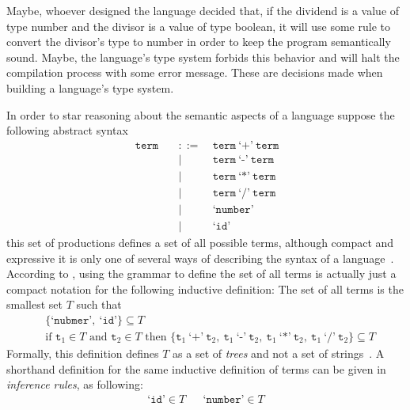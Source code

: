 \documentclass[
  oneside,
  english,
  coorientadorbanca,
  embeddedlogo,
  noabntexcite
]{ufsc-thesis-rn46-2019}
\newcommand{\bnfvar}[1]{\ \bnfvars{#1}}
\newcommand{\bnfvars}[1]{\texttt{#1}}
\newcommand{\bnfter}[1]{\ \bnfters{#1}}
\newcommand{\bnfters}[1]{\textrm{`}\texttt{#1}\textrm{'}}
\newcommand{\bnfprod}[2]{\bnfvars{#1} &\ &::= & #2}
\newcommand{\bnfmore}[1]{ && \mid{} & #1}
\begin{document}
Maybe, whoever designed the language decided that, if the dividend is a value of type number and the divisor is a value of type boolean, it will use some rule to convert the divisor's type to number in order to keep the program semantically sound.
Maybe, the language's type system forbids this behavior and will halt the compilation process with some error message.
These are decisions made when building a language's type system.

In order to star reasoning about the semantic aspects of a language suppose the following abstract syntax
\begin{equation}~\label{eq:sample_term_ast}
  \begin{alignedat}{2}
    \bnfprod{term}{\bnfvar{term} \bnfter{+} \bnfvar{term}} \\
    \bnfmore{\bnfvar{term} \bnfter{-} \bnfvar{term}}       \\
    \bnfmore{\bnfvar{term} \bnfter{*} \bnfvar{term}}       \\
    \bnfmore{\bnfvar{term} \bnfter{/} \bnfvar{term}}       \\
    \bnfmore{\bnfter{number}}                              \\
    \bnfmore{\bnfter{id}}
  \end{alignedat}
\end{equation}
this set of productions defines a set of all possible terms, although compact and expressive it is only one of several ways of describing the syntax of a language~\cite{pierce2002types}.
According to \textcite{pierce2002types}, using the grammar to define the set of all terms is actually just a compact notation for the following inductive definition: The set of all terms is the smallest set $T$ such that
\begin{align}
   & \{\bnfters{nubmer}, \bnfter{id}\} \subseteq T \label{eq:example_clause1}            \\
   & \textrm{if } \bnfvars{t}_1 \in T \textrm{ and } \bnfvars{t}_2 \in T \textrm{ then }
  \{
  \bnfvars{t}_1 \bnfter{+} \bnfvar{t}_2,
  \bnfvar{t}_1 \bnfter{-} \bnfvar{t}_2,
  \bnfvar{t}_1 \bnfter{*} \bnfvar{t}_2,
  \bnfvar{t}_1 \bnfter{/} \bnfvar{t}_2
  \} \subseteq T\label{eq:example_clause2}
\end{align}
Formally, this definition defines $T$ as a set of \textit{trees} and not a set of strings~\cite{pierce2002types}.
A shorthand definition for the same inductive definition of terms can be given in \textit{inference rules}, as following:
\begin{align*}
  \bnfters{id} \in T &  & \bnfters{number} \in T
\end{align*}
\end{document}

